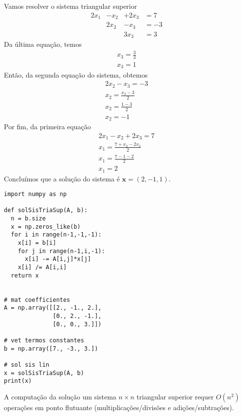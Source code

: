 \begin{ex}
  Vamos resolver o sistema triangular superior
  \begin{equation}
    \begin{matrix}
      2x_1 &- x_2 &+ 2x_3 &= 7\\
      & 2x_2 &- x_3 &= -3\\
      &&3x_3 &= 3
    \end{matrix}
  \end{equation}
  Da última equação, temos
  \begin{gather}
    x_3 = \frac{3}{3}\\
    x_3 = 1
  \end{gather}
  Então, da segunda equação do sistema, obtemos
  \begin{gather}
    2x_2 - x_3 = -3\\
    x_2 = \frac{x_3 - 3}{2}\\
    x_2 = \frac{1 - 3}{2}\\
    x_2 = -1
  \end{gather}
  Por fim, da primeira equação
  \begin{gather}
    2x_1 - x_2 + 2x_3 = 7\\
    x_1 = \frac{7 + x_2 - 2x_3}{2}\\
    x_1 = \frac{7 - 1 - 2}{2}\\
    x_1 = 2
  \end{gather}
  Concluímos que a solução do sistema é $\pmb{x} = (2, -1, 1)$.

\begin{lstlisting}[caption=solSisTriaSup.py, label=cap_sislin_sec_lu:cod:solSisTriaSup]
import numpy as np

def solSisTriaSup(A, b):
  n = b.size
  x = np.zeros_like(b)
  for i in range(n-1,-1,-1):
    x[i] = b[i]
    for j in range(n-1,i,-1):
      x[i] -= A[i,j]*x[j]
    x[i] /= A[i,i]
  return x
    

# mat coefficientes
A = np.array([[2., -1., 2.],
              [0., 2., -1.],
              [0., 0., 3.]])

# vet termos constantes
b = np.array([7., -3., 3.])

# sol sis lin
x = solSisTriaSup(A, b)
print(x)
\end{lstlisting}

\end{ex}

\begin{obs}
  A computação da solução um sistema $n\times n$ triangular superior requer $O(n^2)$ operações em ponto flutuante (multiplicações/divisões e adições/subtrações).
\end{obs}

